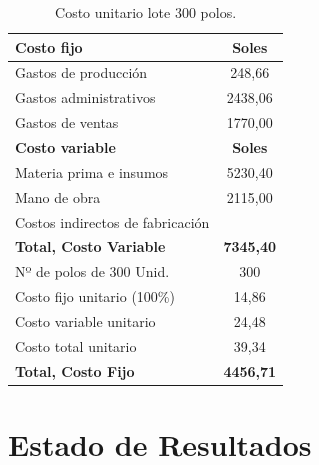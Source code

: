 \documentclass[a4paper,openright,12pt]{book}
\begin{document}
\begin{table}[H]
\centering
\begin{tabular}{lc}
\hline
\textbf{Costo   fijo}              & \textbf{Soles}   \\ \hline
Gastos de producción               & 248,66           \\
Gastos administrativos             & 2438,06          \\
Gastos de ventas                   & 1770,00          \\
\textbf{Costo   variable}          & \textbf{Soles}   \\
Materia   prima e insumos          & 5230,40          \\
Mano   de obra                     & 2115,00          \\
Costos   indirectos de fabricación &                  \\
\textbf{Total,   Costo Variable}   & \textbf{7345,40} \\
Nº   de polos de 300 Unid.         & 300              \\
Costo   fijo unitario (100\%)      & 14,86            \\
Costo   variable unitario          & 24,48            \\
Costo   total unitario             & 39,34            \\
\textbf{Total, Costo Fijo}         & \textbf{4456,71} \\ \hline
\end{tabular}
\caption{Costo unitario lote 300 polos.}
\label{Tabla9}
\end{table}


\section{Estado de Resultados}
\end{document}
